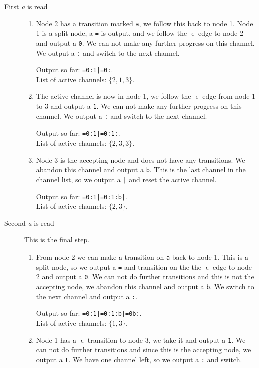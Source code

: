 \begin{example}[Protocol]
\begin{description}
  \item[First \textsl{a} is read]
    \begin{enumerate}
    \item Node 2 has a transition marked \texttt{a}, we follow this
      back to node 1. Node 1 is a split-node, a \texttt{=} is output,
      and we follow the $\upvarepsilon$-edge to node 2 and output a
      \texttt{0}. We can not make any further progress on this
      channel. We output a \texttt{:} and switch to the next channel.

      Output so far: \texttt{=0:1|=0:}. \\
      List of active channels: $\{2, 1, 3\}$.
    \item The active channel is now in node 1, we follow the
      $\upvarepsilon$-edge from node 1 to 3 and output a
      \texttt{1}. We can not make any further progress on this
      channel. We output a \texttt{:} and switch to the next channel.

      Output so far: \texttt{=0:1|=0:1:}. \\
      List of active channels: $\{2, 3, 3\}$.
    \item Node 3 is the accepting node and does not have any
      transitions. We abandon this channel and output a
      \texttt{b}. This is the last channel in the channel list, so we
      output a \texttt{|} and reset the active channel.

      Output so far: \texttt{=0:1|=0:1:b|}. \\
      List of active channels: $\{2, 3\}$.
    \end{enumerate}
  \item[Second \textsl{a} is read] This is the final step.
    \begin{enumerate}
      \item From node 2 we can make a transition on \texttt{a} back to
        node 1. This is a split node, so we output a \texttt{=} and
        transition on the the $\upvarepsilon$-edge to node 2 and
        output a \texttt{0}. We can not do further transitions and
        this is not the accepting node, we abandon this channel and
        output a \texttt{b}. We switch to the next channel and output
        a \texttt{:}.

        Output so far: \texttt{=0:1|=0:1:b|=0b:}. \\
        List of active channels: $\{1, 3\}$.
      \item Node 1 has a $\upvarepsilon$-transition to node 3, we take
        it and output a \texttt{1}. We can not do further transitions
        and since this is the accepting node, we output a
        \texttt{t}. We have one channel left, so we output a
        \texttt{:} and switch.


\end{enumerate}
\end{description}
\end{example}
